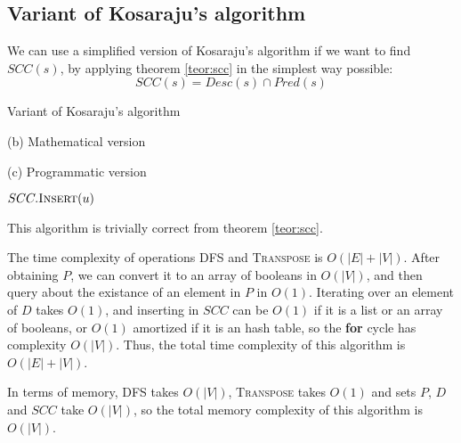 \subsection{Variant of Kosaraju's algorithm} \label{algorithm-scc-kosaraju-v}
We can use a simplified version of Kosaraju's algorithm if we want to find $SCC(s)$, by applying theorem \ref{teor:scc} in the simplest way possible:
\begin{equation*}
    SCC(s) = Desc(s) \cap Pred(s)
\end{equation*}
\begin{algorithm}[H]
    \caption{Variant of Kosaraju's algorithm}
    \label{alg-kosaraju-v}
    \begin{minipage}[t]{0.49\textwidth}
        (b) Mathematical version
        \begin{algorithmic}[1]
                 
                 
                \State {}
            \EndFunction
        \end{algorithmic}
    \end{minipage}
    \begin{minipage}[t]{0.49\textwidth}
        (c) Programmatic version
        \begin{algorithmic}[1]
                 
                 
                     {$SCC.\Call{Insert}{u}$}
                    \EndIf
                \EndFor
                \State {}
            \EndFunction
        \end{algorithmic}
    \end{minipage}
\end{algorithm}
This algorithm is trivially correct from theorem \ref{teor:scc}.\par
The time complexity of operations \textsc{DFS} and \textsc{Transpose} is $O(|E|+|V|)$. After obtaining $P$, we can convert it to an array of booleans in $O(|V|)$, and then query about the existance of an element in $P$ in $O(1)$. Iterating over an element of $D$ takes $O(1)$, and inserting in $SCC$ can be $O(1)$ if it is a list or an array of booleans, or $O(1)$ amortized if it is an hash table, so the \textbf{for} cycle has complexity $O(|V|)$. Thus, the total time complexity of this algorithm is $O(|E|+|V|)$.\par
In terms of memory, \textsc{DFS} takes $O(|V|)$, \textsc{Transpose} takes $O(1)$ and sets $P$, $D$ and $SCC$ take $O(|V|)$, so the total memory complexity of this algorithm is $O(|V|)$.
